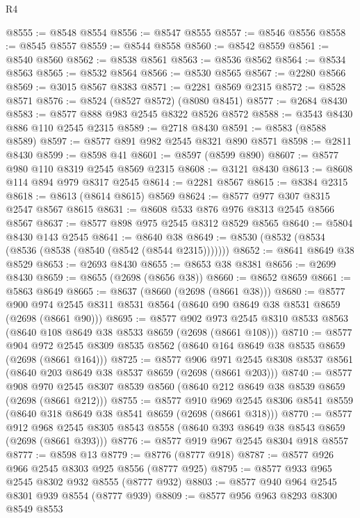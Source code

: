 \begin{lexlean}{R4}
\begin{coremodule}
@8555 := @8548 @8554
@8556 := @8547 @8555
@8557 := @8546 @8556
@8558 := @8545 @8557
@8559 := @8544 @8558
@8560 := @8542 @8559
@8561 := @8540 @8560
@8562 := @8538 @8561
@8563 := @8536 @8562
@8564 := @8534 @8563
@8565 := @8532 @8564
@8566 := @8530 @8565
@8567 := @2280 @8566
@8569 := @3015 @8567 @8383
@8571 := @2281 @8569 @2315
@8572 := @8528 @8571
@8576 := @8524 (@8527 @8572) (@8080 @8451)
@8577 := @2684 @8430
@8583 := @8577 @888 @983 @2545 @8322 @8526 @8572
@8588 := @3543 @8430 @886 @110 @2545 @2315
@8589 := @2718 @8430
@8591 := @8583 (@8588 @8589)
@8597 := @8577 @891 @982 @2545 @8321 @890 @8571
@8598 := @2811 @8430
@8599 := @8598 @41
@8601 := @8597 (@8599 @890)
@8607 := @8577 @980 @110 @8319 @2545 @8569 @2315
@8608 := @3121 @8430
@8613 := @8608 @114 @894 @979 @8317 @2545
@8614 := @2281 @8567
@8615 := @8384 @2315
@8618 := @8613 (@8614 @8615) @8569
@8624 := @8577 @977 @307 @8315 @2547 @8567 @8615
@8631 := @8608 @533 @876 @976 @8313 @2545 @8566 @8567
@8637 := @8577 @898 @975 @2545 @8312 @8529 @8565
@8640 := @5804 @8430 @143 @2545
@8641 := @8640 @38
@8649 := @8530 (@8532 (@8534 (@8536 (@8538 (@8540 (@8542 (@8544 @2315)))))))
@8652 := @8641 @8649 @38 @8529
@8653 := @2693 @8430
@8655 := @8653 @38 @8381
@8656 := @2699 @8430
@8659 := @8655 (@2698 (@8656 @38))
@8660 := @8652 @8659
@8661 := @5863 @8649
@8665 := @8637 (@8660 (@2698 (@8661 @38)))
@8680 := @8577
    @900
    @974
    @2545
    @8311
    @8531
    @8564
    (@8640 @90 @8649 @38 @8531 @8659 (@2698 (@8661 @90)))
@8695 := @8577
    @902
    @973
    @2545
    @8310
    @8533
    @8563
    (@8640 @108 @8649 @38 @8533 @8659 (@2698 (@8661 @108)))
@8710 := @8577
    @904
    @972
    @2545
    @8309
    @8535
    @8562
    (@8640 @164 @8649 @38 @8535 @8659 (@2698 (@8661 @164)))
@8725 := @8577
    @906
    @971
    @2545
    @8308
    @8537
    @8561
    (@8640 @203 @8649 @38 @8537 @8659 (@2698 (@8661 @203)))
@8740 := @8577
    @908
    @970
    @2545
    @8307
    @8539
    @8560
    (@8640 @212 @8649 @38 @8539 @8659 (@2698 (@8661 @212)))
@8755 := @8577
    @910
    @969
    @2545
    @8306
    @8541
    @8559
    (@8640 @318 @8649 @38 @8541 @8659 (@2698 (@8661 @318)))
@8770 := @8577
    @912
    @968
    @2545
    @8305
    @8543
    @8558
    (@8640 @393 @8649 @38 @8543 @8659 (@2698 (@8661 @393)))
@8776 := @8577 @919 @967 @2545 @8304 @918 @8557
@8777 := @8598 @13
@8779 := @8776 (@8777 @918)
@8787 := @8577 @926 @966 @2545 @8303 @925 @8556 (@8777 @925)
@8795 := @8577 @933 @965 @2545 @8302 @932 @8555 (@8777 @932)
@8803 := @8577 @940 @964 @2545 @8301 @939 @8554 (@8777 @939)
@8809 := @8577 @956 @963 @8293 @8300 @8549 @8553

\end{coremodule}
\end{lexlean}
